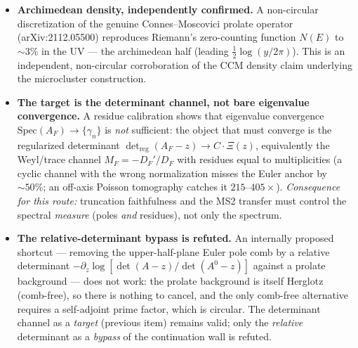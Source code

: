 \documentclass[12pt,a4paper]{article}
\theoremstyle{definition}
\theoremstyle{remark}
\begin{document}
\begin{itemize}
  \item \textbf{Archimedean density, independently confirmed.} A non-circular
    discretization of the genuine Connes--Moscovici prolate operator
    (arXiv:2112.05500) reproduces Riemann's zero-counting function $N(E)$ to
    $\sim 3\%$ in the UV --- the archimedean half (leading
    $\tfrac12\log(y/2\pi)$). This is an independent, non-circular corroboration
    of the CCM density claim underlying the microcluster construction.
  \item \textbf{The target is the determinant channel, not bare eigenvalue
    convergence.} A residue calibration shows that eigenvalue convergence
    $\mathrm{Spec}(A_F)\to\{\gamma_n\}$ is \emph{not} sufficient: the object that
    must converge is the regularized determinant
    $\det_{\mathrm{reg}}(A_F-z)\to C\cdot\Xi(z)$, equivalently the Weyl/trace
    channel $M_F=-D_F'/D_F$ with residues equal to multiplicities (a cyclic
    channel with the wrong normalization misses the Euler anchor by $\sim 50\%$;
    an off-axis Poisson tomography catches it $215$--$405\times$). \emph{Consequence
    for this route:} truncation faithfulness and the MS2 transfer must control the
    spectral \emph{measure} (poles \emph{and} residues), not only the spectrum.
  \item \textbf{The relative-determinant bypass is refuted.} An internally
    proposed shortcut --- removing the upper-half-plane Euler pole comb by a
    relative determinant $-\partial_z\log[\det(A-z)/\det(A^0-z)]$ against a prolate
    background --- does not work: the prolate background is itself Herglotz
    (comb-free), so there is nothing to cancel, and the only comb-free alternative
    requires a self-adjoint prime factor, which is circular. The determinant
    channel as a \emph{target} (previous item) remains valid; only the
    \emph{relative} determinant as a \emph{bypass} of the continuation wall is
    refuted.
\end{itemize}
\end{document}
